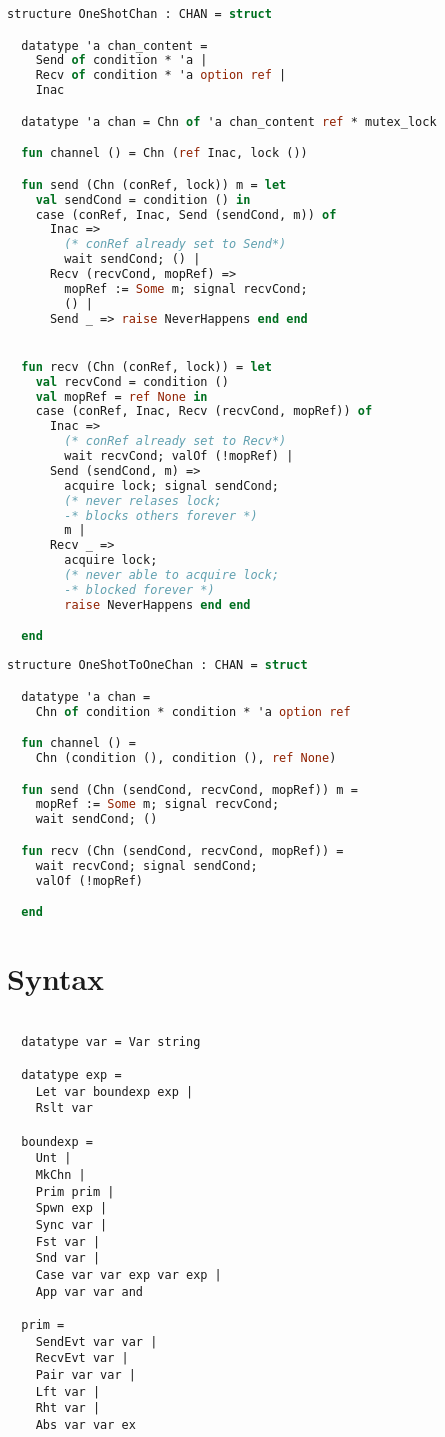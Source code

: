 \begin{lstlisting}[language=ML, style=codestyle1]
  structure OneShotChan : CHAN = struct

  datatype 'a chan_content =
    Send of condition * 'a |
    Recv of condition * 'a option ref |
    Inac  

  datatype 'a chan = Chn of 'a chan_content ref * mutex_lock

  fun channel () = Chn (ref Inac, lock ())

  fun send (Chn (conRef, lock)) m = let
    val sendCond = condition () in
    case (conRef, Inac, Send (sendCond, m)) of
      Inac =>
        (* conRef already set to Send*)
        wait sendCond; () |
      Recv (recvCond, mopRef) =>
        mopRef := Some m; signal recvCond;
        () |
      Send _ => raise NeverHappens end end


  fun recv (Chn (conRef, lock)) = let
    val recvCond = condition ()
    val mopRef = ref None in
    case (conRef, Inac, Recv (recvCond, mopRef)) of
      Inac =>
        (* conRef already set to Recv*)
        wait recvCond; valOf (!mopRef) |
      Send (sendCond, m) =>
        acquire lock; signal sendCond;
        (* never relases lock;
        -* blocks others forever *)
        m |
      Recv _ =>
        acquire lock;
        (* never able to acquire lock;
        -* blocked forever *)
        raise NeverHappens end end

  end
  \end{lstlisting}

\begin{lstlisting}[language=ML, style=codestyle1]
structure OneShotToOneChan : CHAN = struct

  datatype 'a chan =
    Chn of condition * condition * 'a option ref

  fun channel () =
    Chn (condition (), condition (), ref None)

  fun send (Chn (sendCond, recvCond, mopRef)) m =
    mopRef := Some m; signal recvCond;  
    wait sendCond; ()

  fun recv (Chn (sendCond, recvCond, mopRef)) =
    wait recvCond; signal sendCond;
    valOf (!mopRef)

  end
  \end{lstlisting}


\section{Syntax}

\begin{lstlisting}[style=codestyle1]

  datatype var = Var string

  datatype exp = 
    Let var boundexp exp |
    Rslt var

  boundexp =
    Unt |
    MkChn |
    Prim prim |
    Spwn exp |
    Sync var |
    Fst var |
    Snd var |
    Case var var exp var exp |
    App var var and

  prim = 
    SendEvt var var |
    RecvEvt var |
    Pair var var |
    Lft var |
    Rht var |
    Abs var var ex

\end{lstlisting}



